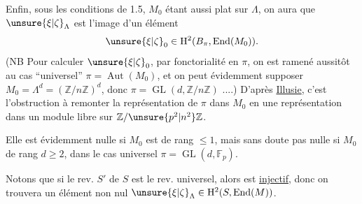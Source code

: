 Enfin, sous les conditions de 1.5, $M_0$ étant aussi plat sur $\Lambda$, on aura que $\unsure{\xi|\zeta}_\Lambda$ est l'image d'un élément
\[
\unsure{\xi|\zeta}_0\in\mathrm H^2(B_\pi,\operatorname{End}(M_0)).
\]
(NB Pour calculer $\unsure{\xi|\zeta}_0$, par fonctorialité en $\pi$, on est ramené aussitôt au cas ``universel'' $\pi=\operatorname{Aut}(M_0)$, et on peut évidemment supposer $M_0=\Lambda^d=(\mathbb Z/n\mathbb Z)^d$, donc $\pi=\operatorname{GL}(d,\mathbb Z/n\mathbb Z)$ ....) D'après \uline{Illusie}, c'est l'obstruction à remonter la représentation de $\pi$ dans $M_0$ en une représentation dans un module libre sur $\mathbb Z/\unsure{p^2|n^2}\mathbb Z$.

 Elle est évidemment nulle si $M_0$ est de rang $\leq1$, mais sans doute pas nulle si $M_0$ de rang $d\geq2$, dans le cas universel $\pi=\operatorname{GL}(d,\mathbb F_p)$.

Notons que si le rev. $S'$ de $S$ est le rev. universel, alors
est \uline{injectif}, donc on trouvera un élément non nul  $\unsure{\xi|\zeta}_\Lambda\in\mathrm H^2(S,\operatorname{End}(M))$.
